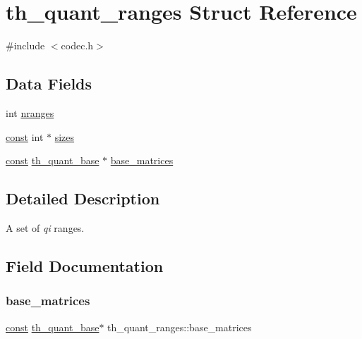 \hypertarget{structth__quant__ranges}{}\section{th\+\_\+quant\+\_\+ranges Struct Reference}
\label{structth__quant__ranges}


{\ttfamily \#include $<$codec.\+h$>$}

\subsection*{Data Fields}
\begin{DoxyCompactItemize}
\item 
int \hyperlink{structth__quant__ranges_a53e5a3d7f7a112100b4b670929b3ebab}{nranges}
\item 
\hyperlink{zconf_8h_a2c212835823e3c54a8ab6d95c652660e}{const} int $\ast$ \hyperlink{structth__quant__ranges_af3188a373bc0b8ffaa330d0ab4c1a194}{sizes}
\item 
\hyperlink{zconf_8h_a2c212835823e3c54a8ab6d95c652660e}{const} \hyperlink{theora_2codec_8h_a6a1426d16beef8a311d7f0e9d2e96326}{th\+\_\+quant\+\_\+base} $\ast$ \hyperlink{structth__quant__ranges_a52cb432f034737087492ea448de20bdb}{base\+\_\+matrices}
\end{DoxyCompactItemize}


\subsection{Detailed Description}
A set of {\itshape qi} ranges. 

\subsection{Field Documentation}
\mbox{\label{structth__quant__ranges_a52cb432f034737087492ea448de20bdb}} 
\subsubsection{\texorpdfstring{base\+\_\+matrices}{base\_matrices}}
{\footnotesize\ttfamily \hyperlink{zconf_8h_a2c212835823e3c54a8ab6d95c652660e}{const} \hyperlink{theora_2codec_8h_a6a1426d16beef8a311d7f0e9d2e96326}{th\+\_\+quant\+\_\+base}$\ast$ th\+\_\+quant\+\_\+ranges\+::base\+\_\+matrices}

